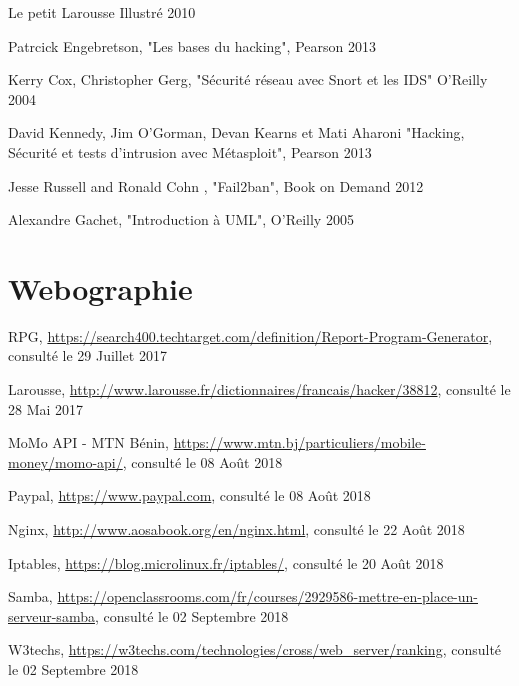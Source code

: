 \begin{thebibliography}{9}
 
 Le petit Larousse Illustré 2010

Patrcick Engebretson, "Les bases du hacking", Pearson 2013	

Kerry Cox, Christopher Gerg, "Sécurité réseau avec Snort et les IDS"  O'Reilly 2004	
    
David Kennedy, Jim O'Gorman, Devan Kearns et Mati Aharoni "Hacking, Sécurité et tests d'intrusion avec Métasploit", Pearson 2013

Jesse Russell and Ronald Cohn , "Fail2ban", Book on Demand 2012

Alexandre Gachet, "Introduction à UML", O'Reilly 2005

\chapter*{Webographie}

RPG, \url{https://search400.techtarget.com/definition/Report-Program-Generator}, consulté le 29 Juillet 2017

Larousse, \url{http://www.larousse.fr/dictionnaires/francais/hacker/38812}, consulté le 28 Mai 2017

MoMo API - MTN B\'enin, \url{https://www.mtn.bj/particuliers/mobile-money/momo-api/}, consulté le 08 Août 2018

Paypal, \url{https://www.paypal.com}, consulté le 08 Août 2018

Nginx, \url{http://www.aosabook.org/en/nginx.html}, consulté le 22 Août 2018

Iptables, \url{https://blog.microlinux.fr/iptables/}, consulté le 20 Août 2018

Samba, \url{https://openclassrooms.com/fr/courses/2929586-mettre-en-place-un-serveur-samba}, consulté le 02 Septembre 2018

W3techs, \url{https://w3techs.com/technologies/cross/web_server/ranking}, consulté le 02 Septembre 2018

\end{thebibliography}
